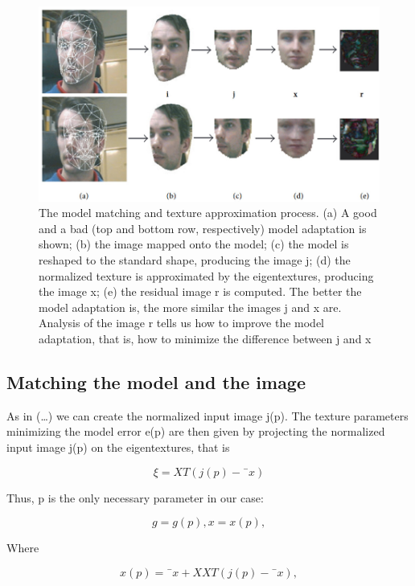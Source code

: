 \documentclass[12pt]{acmart}
\begin{document}
\begin{spacing}{2}
\begin{figure}[H]
    \centering
    \includegraphics[width=130mm]{Figure1.jpg}
    \caption{The model matching and texture approximation process. (a) A good and a bad (top and bottom row, respectively) model adaptation is shown; (b) the image mapped onto the model; (c) the model is reshaped to the standard shape, producing the image j; (d) the normalized texture is approximated by the eigentextures, producing the image x; (e) the residual image r is computed. The better the model adaptation is, the more similar the images j and x are. Analysis of the image r tells us how to improve the model adaptation, that is, how to minimize the difference between j and x}
\end{figure}



\subsection{Matching the model and the image}{}As in (…) we can create the normalized input image j(p). The texture parameters minimizing the model error e(p) are then given by projecting the normalized input image j(p) on the eigentextures, that is


\begin{equation}
    \xi = XT (j(p)- ¯x)
\end{equation}

Thus, p is the only necessary parameter in our case:

\begin{equation}
    g = g(p), x = x(p),
\end{equation}

Where

\begin{equation}
    x(p)= ¯x+ XXT (j(p)- ¯x),
\end{equation}



\end{spacing}
\end{document}
